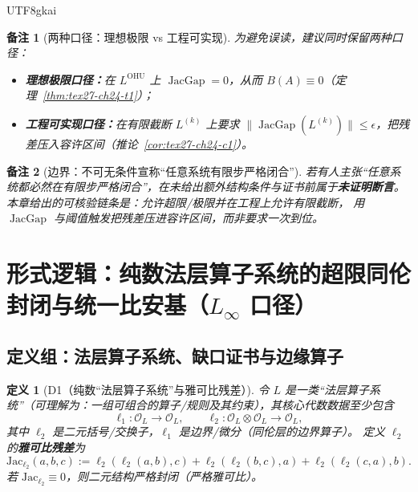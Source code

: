 \documentclass[12pt]{article}
\newtheorem{definition}{定义}[section]
\newtheorem{remark}{备注}[section]
\newcommand{\JacGap}{\operatorname{JacGap}}
\begin{document}
\begin{CJK*}{UTF8}{gkai}
\begin{remark}[两种口径：理想极限 vs 工程可实现]
为避免误读，建议同时保留两种口径：
\begin{itemize}
  \item \textbf{理想极限口径：}在 $L^{\mathrm{OHU}}$ 上 $\JacGap=0$，从而 $B(A)\equiv 0$（定理~\ref{thm:tex27-ch24-t1}）；
  \item \textbf{工程可实现口径：}在有限截断 $L^{(k)}$ 上要求 $\|\JacGap(L^{(k)})\|\le\epsilon$，把残差压入容许区间（推论~\ref{cor:tex27-ch24-c1}）。
\end{itemize}
\end{remark}

\begin{remark}[边界：不可无条件宣称“任意系统有限步严格闭合”]
若有人主张“任意系统都必然在有限步严格闭合”，在未给出额外结构条件与证书前属于\textbf{未证明断言}。
本章给出的可核验链条是：允许超限/极限并在工程上允许有限截断，
用 $\JacGap$ 与阈值触发把残差压进容许区间，而非要求一次到位。
\end{remark}

\clearpage

\section{形式逻辑：纯数法层算子系统的超限同伦封闭与统一比安基（\texorpdfstring{$L_\infty$}{Linfty} 口径）}
\label{sec:tex27-ch25-linfty-homotopy}

\subsection{定义组：法层算子系统、缺口证书与边缘算子}
\label{subsec:tex27-ch25-defs}

\begin{definition}[D1（纯数“法层算子系统”与雅可比残差）]
\label{def:tex27-ch25-d1}
令 $L$ 是一类“法层算子系统”（可理解为：一组可组合的算子/规则及其约束），其核心代数数据至少包含
\[
  \ell_1:\mathcal{O}_L\to \mathcal{O}_L,
  \qquad
  \ell_2:\mathcal{O}_L\otimes \mathcal{O}_L\to \mathcal{O}_L,
\]
其中 $\ell_2$ 是二元括号/交换子，$\ell_1$ 是边界/微分（同伦层的边界算子）。
定义 $\ell_2$ 的\textbf{雅可比残差}为
\[
  \mathrm{Jac}_{\ell_2}(a,b,c)
  :=
  \ell_2(\ell_2(a,b),c)+\ell_2(\ell_2(b,c),a)+\ell_2(\ell_2(c,a),b).
\]
若 $\mathrm{Jac}_{\ell_2}\equiv 0$，则二元结构严格封闭（严格雅可比）。
\end{definition}


\end{CJK*}
\end{document}
